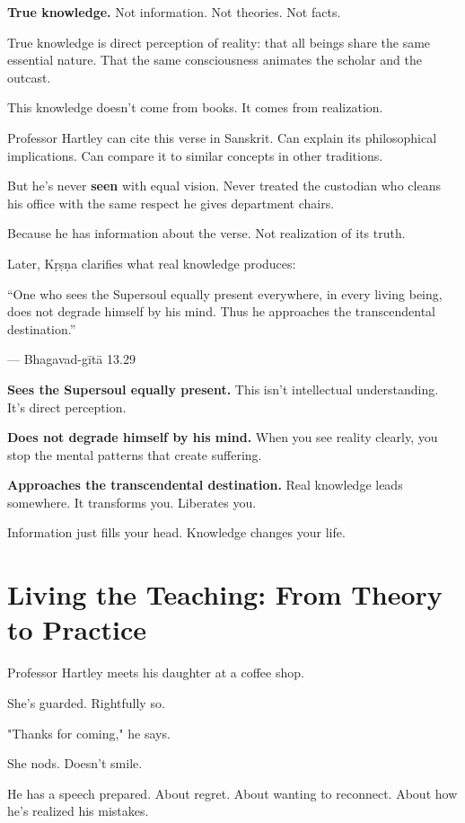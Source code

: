 \documentclass[11pt,twoside]{book}
\begin{document}
\textbf{\textbf{True knowledge.}} Not information. Not theories. Not facts.

True knowledge is direct perception of reality: that all beings share the same essential nature. That the same consciousness animates the scholar and the outcast.

This knowledge doesn't come from books. It comes from realization.

Professor Hartley can cite this verse in Sanskrit. Can explain its philosophical implications. Can compare it to similar concepts in other traditions.

But he's never \textbf{seen} with equal vision. Never treated the custodian who cleans his office with the same respect he gives department chairs.

Because he has information about the verse. Not realization of its truth.

Later, Kṛṣṇa clarifies what real knowledge produces:

\begin{pullquote}
``One who sees the Supersoul equally present everywhere, in every living being, does not degrade himself by his mind. Thus he approaches the transcendental destination.''

--- Bhagavad-gītā 13.29
\end{pullquote}

\textbf{\textbf{Sees the Supersoul equally present.}} This isn't intellectual understanding. It's direct perception.

\textbf{\textbf{Does not degrade himself by his mind.}} When you see reality clearly, you stop the mental patterns that create suffering.

\textbf{\textbf{Approaches the transcendental destination.}} Real knowledge leads somewhere. It transforms you. Liberates you.

Information just fills your head. Knowledge changes your life.

\section*{Living the Teaching: From Theory to Practice}

Professor Hartley meets his daughter at a coffee shop.

She's guarded. Rightfully so.

"Thanks for coming," he says.

She nods. Doesn't smile.

He has a speech prepared. About regret. About wanting to reconnect. About how he's realized his mistakes.
\end{document}
